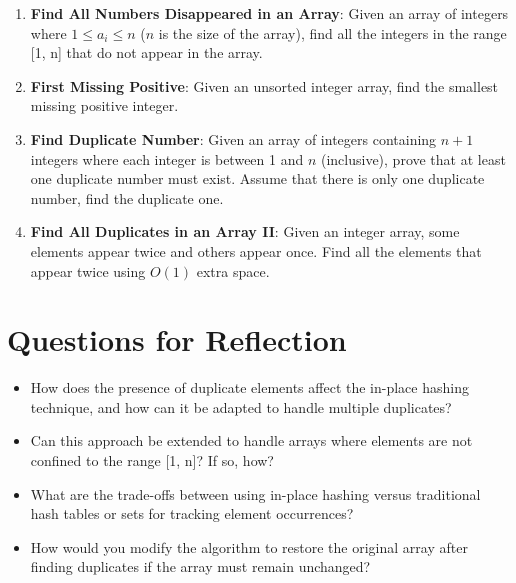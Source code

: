 \begin{enumerate}
    \item \textbf{Find All Numbers Disappeared in an Array}: Given an array of integers where \(1 \leq a_i \leq n\) (\(n\) is the size of the array), find all the integers in the range [1, n] that do not appear in the array.
    
    \item \textbf{First Missing Positive}: Given an unsorted integer array, find the smallest missing positive integer.
    
    \item \textbf{Find Duplicate Number}: Given an array of integers containing \(n + 1\) integers where each integer is between 1 and \(n\) (inclusive), prove that at least one duplicate number must exist. Assume that there is only one duplicate number, find the duplicate one.
    
    \item \textbf{Find All Duplicates in an Array II}: Given an integer array, some elements appear twice and others appear once. Find all the elements that appear twice using \(O(1)\) extra space.
\end{enumerate}

\section*{Questions for Reflection}

\begin{itemize}
    \item How does the presence of duplicate elements affect the in-place hashing technique, and how can it be adapted to handle multiple duplicates?
    
    \item Can this approach be extended to handle arrays where elements are not confined to the range [1, n]? If so, how?
    
    \item What are the trade-offs between using in-place hashing versus traditional hash tables or sets for tracking element occurrences?
    
    \item How would you modify the algorithm to restore the original array after finding duplicates if the array must remain unchanged?
\end{itemize}
